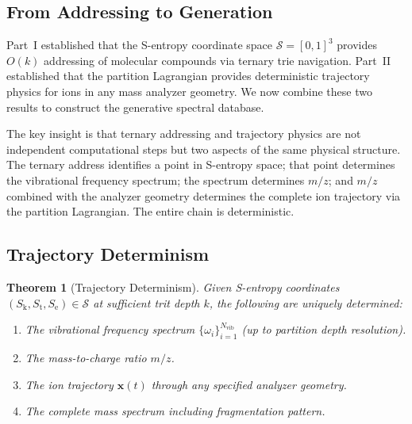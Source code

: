 \documentclass[11pt,twocolumn,a4paper]{article}
\newtheorem{theorem}{Theorem}[section]
\theoremstyle{definition}
\theoremstyle{remark}
\newcommand{\Sk}{S_{\mathrm{k}}}
\newcommand{\St}{S_{\mathrm{t}}}
\newcommand{\Se}{S_{\mathrm{e}}}
\newcommand{\Sspace}{\mathcal{S}}
\newcommand{\Nvib}{N_{\mathrm{vib}}}
\begin{document}
\subsection{From Addressing to Generation}
\label{sec:addressing-to-generation}

Part~I established that the S-entropy coordinate space $\Sspace = [0,1]^3$ provides $O(k)$ addressing of molecular compounds via ternary trie navigation. Part~II established that the partition Lagrangian provides deterministic trajectory physics for ions in any mass analyzer geometry. We now combine these two results to construct the generative spectral database.

The key insight is that ternary addressing and trajectory physics are not independent computational steps but two aspects of the same physical structure. The ternary address identifies a point in S-entropy space; that point determines the vibrational frequency spectrum; the spectrum determines $m/z$; and $m/z$ combined with the analyzer geometry determines the complete ion trajectory via the partition Lagrangian. The entire chain is deterministic.

\subsection{Trajectory Determinism}
\label{sec:determinism-theorem}

\begin{theorem}[Trajectory Determinism]
\label{thm:trajectory-determinism}
Given S-entropy coordinates $(\Sk, \St, \Se) \in \Sspace$ at sufficient trit depth $k$, the following are uniquely determined:
\begin{enumerate}[label=(\alph*)]
  \item The vibrational frequency spectrum $\{\omega_i\}_{i=1}^{\Nvib}$ (up to partition depth resolution).
  \item The mass-to-charge ratio $m/z$.
  \item The ion trajectory $\mathbf{x}(t)$ through any specified analyzer geometry.
  \item The complete mass spectrum including fragmentation pattern.
\end{enumerate}
\end{theorem}
\end{document}
